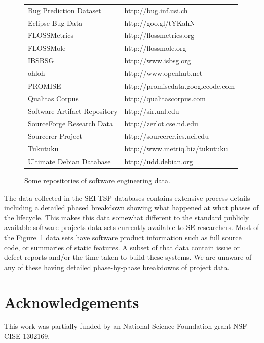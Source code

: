 \documentclass{sig-alternate}
\newcommand{\fig}[1]{Figure~\ref{fig:#1}}
\begin{document}
\begin{figure}
\begin{center}
\scriptsize\begin{tabular}{|l@{~:~}l|}\hline
Bug Prediction Dataset &http://bug.inf.usi.ch \\
Eclipse Bug Data &http://goo.gl/tYKahN \\
FLOSSMetrics& http://flossmetrics.org \\
FLOSSMole &http://flossmole.org \\
IBSBSG& http://www.isbsg.org \\
ohloh& http://www.openhub.net \\
PROMISE &http://promisedata.googlecode.com \\
Qualitas Corpus &http://qualitascorpus.com \\
Software Artifact Repository &http://sir.unl.edu \\
SourceForge Research Data &http://zerlot.cse.nd.edu \\
Sourcerer Project &http://sourcerer.ics.uci.edu \\
Tukutuku &http://www.metriq.biz/tukutuku \\
Ultimate Debian Database &http://udd.debian.org\\\hline
\end{tabular}
\end{center}
\caption{Some repositories of software engineering data.}\label{fig:sedata}
\end{figure}
The data collected in the SEI TSP databases contains 
extensive process details
including a detailed phased breakdown showing what happened at what
phases of the lifecycle. This makes this data somewhat different to the standard
 publicly available
software projects data sets currently available to 
SE researchers. Most of the \fig{sedata} data sets have software product information
such as full source code, or summaries of static features.
A subset of that data contain issue or defect reports and/or
the time taken to build these systems.  We are unaware
of any of these having detailed phase-by-phase breakdowns of project data.



\section*{Acknowledgements}
This work was partially funded by an National Science
Foundation grant NSF-CISE 1302169.

\clearpage
\vspace*{0.5mm}
\scriptsize

 
\end{document}
